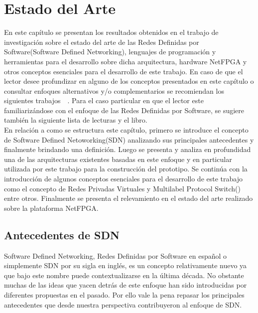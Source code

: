 
\chapter{Estado del Arte}  %

\ifpdf
    \graphicspath{{Chapter2/Figs/Raster/}{Chapter2/Figs/PDF/}{Chapter2/Figs/}}
\else
    \graphicspath{{Chapter2/Figs/Vector/}{Chapter2/Figs/}}
\fi

En este capítulo se presentan los resultados obtenidos en el trabajo de investigación sobre el estado
del arte de las Redes Definidas por Software(Software Defined Networking), lenguajes
de programación y herramientas para el desarrollo sobre dicha arquitectura, hardware NetFPGA y otros conceptos esenciales para el desarrollo de este trabajo. En caso de que el lector desee profundizar en alguno de los conceptos presentados en este cap\'itulo o consultar enfoques alternativos
y/o complementarios se recomiendan los siguientes trabajos~\citep{StateOfArt1}~\citep{StateOfArt2}. Para el caso particular en que el lector este familiarizándose con el enfoque de las Redes Definidas por Software, se sugiere también la siguiente lista de lecturas\citep{SDNReadingList} y el libro\citep{SDNBook1}.\\

En relación a como se estructura este cap\'itulo, primero se introduce el concepto de Software Defined Netoworking(SDN) analizando sus principales antecedentes y finalmente brindando una definición. Luego se presenta y analiza en profundidad una de las arquitecturas existentes basadas en este enfoque y en particular utilizada por este trabajo para la construcción del prototipo. Se contin\'ua con la introducción de algunos conceptos esenciales para el desarrollo de este trabajo como el concepto de Redes Privadas Virtuales y Multilabel Protocol Switch() entre otros. Finalmente se presenta el relevamiento en el estado del arte realizado sobre la plataforma NetFPGA.  

\section{Antecedentes de SDN} %
Software Defined Networking, Redes Definidas por Software en español o simplemente SDN por su sigla en ingl\'es, es un concepto relativamente nuevo ya que bajo este nombre puede contextualizarse en la \'ultima década. No obstante muchas de las ideas que yacen detrás de este enfoque han sido introducidas por diferentes propuestas en el pasado. Por ello vale la pena repasar los principales antecedentes que desde nuestra perspectiva contribuyeron al enfoque de SDN. 

